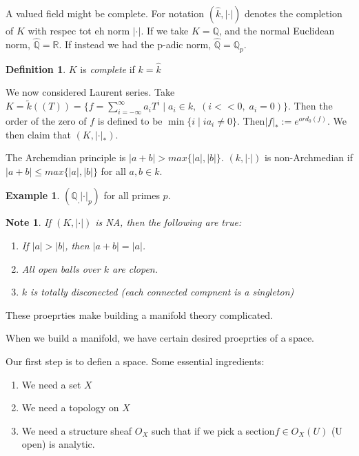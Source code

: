 \documentclass[11pt]{article}
\newtheorem{note}{Note}
\theoremstyle{definition}
\newtheorem{protoexample}{Example}[section]
\newenvironment{ex}
   {\begin{protoexample}}
   {\end{protoexample}}
\newtheorem{protodefinition}{Definition}[section]
\newenvironment{define}
   {\begin{protodefinition}}
   {\end{protodefinition}}
\def\QQ{{\mathbb Q}}
\def\RR{{\mathbb R}}
\begin{document}
A valued field might be complete. For notation $(\hat{k}, |\cdot|)$ denotes the completion of $K$ with respec tot eh norm $|\cdot|$. If we take $K=\QQ$, and the normal Euclidean norm, $\hat{\QQ} = \RR$. If instead we had the p-adic norm, $\hat{\QQ} = \QQ_p$.

\begin{define}
    $K$ is \emph{complete} if $k=\hat{k}$
\end{define}


We now considered Laurent series. Take $K =\tilde{k}((T)) = \{ f = \sum\limits_{i=-\infty}^\infty a_iT^i \; |\; a_i \in k, \;(i<<0, \; a_i=0) \}$. Then the order of the zero of $f$ is defined to be $\min\{i \; |\; ia_i \neq 0\}$.  Then$ |f|_* :=e^{ord_0(f)}$. We then claim that $(K,|\cdot|_*)$.



The Archemdian principle is $|a+b| > max\{|a|, |b|\}$. $(k, |\cdot|)$ is non-Archmedian if $|a+b| \leq max\{|a|, |b|\}$ for all $a,b\in k$. 


\begin{ex}
    $(\QQ_,|\cdot|_p)$ for all primes $p$.
\end{ex}



\begin{note}
    If $(K, |\cdot|)$ is NA, then the following are true:

    \begin{enumerate}
        \item If $|a|>|b|$, then $|a+b|=|a|$.
        \item All open balls over $k$ are clopen.
        \item $k$ is totally disconected (each connected compnent is a singleton)
    \end{enumerate}
\end{note}

These proeprties make building a manifold theory complicated. 

When we build a manifold, we have certain desired proeprties of a space.

Our first step is to defien a space. Some essential ingredients:
\begin{enumerate}
    \item We need a set $X$
    \item We need a topology on $X$
    \item We need a structure sheaf $O_X$ such that if we pick a section$ f\in O_X(U)$ (U open) is analytic.
\end{enumerate}
\end{document}

